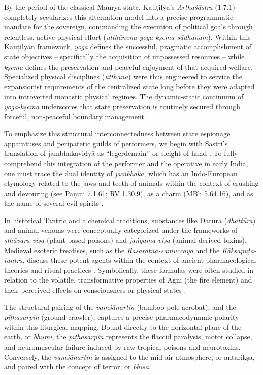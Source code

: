 \documentclass[11pt,twoside,letterpaper]{article}
\begin{document}
By the period of the classical Maurya state, Kauṭilya’s \textit{Arthaśāstra} (1.7.1) completely secularizes this alternation model into a precise programmatic mandate for the sovereign, commanding the execution of political goals through relentless, active physical effort (\textit{utthānena yoga-kṣema sādhanam}). Within this Kauṭilyan framework, \textit{yoga} defines the successful, pragmatic accomplishment of state objectives -- specifically the acquisition of unpossessed resources -- while \textit{kṣema} defines the preservation and peaceful enjoyment of that acquired welfare. Specialized physical disciplines (\textit{utthāna}) were thus engineered to service the expansionist requirements of the centralized state long before they were adapted into introverted monastic physical regimes. The dynamic-static continuum of \textit{yoga-kṣema} underscores that state preservation is routinely secured through forceful, non-peaceful boundary management.

To emphasize this structural interconnectedness between state espionage apparatuses and peripatetic guilds of performers, we begin with Sastri's translation of jambhakavidyā as ``legerdemain'' or sleight-of-hand \citep{shamasastri1929}. To fully comprehend this integration of the performer and the operative in early India, one must trace the dual identity of \textit{jambhaka}, which has an Indo-European etymology related to the jaws and teeth of animals within the context of crushing and devouring (see Pāṇini 7.1.61; RV 1.30.9), as a charm (MBh 5.64.16), and as the name of several evil spirits \citep{narten1965}. 

In historical Tantric and alchemical traditions, substances like Datura (\textit{dhattūra}) and animal venoms were conceptually categorized under the frameworks of \textit{sthāvara-viṣa} (plant-based poisons) and \textit{jaṅgama-viṣa} (animal-derived toxins). Medieval esoteric treatises, such as the \textit{Rasaratna-samuccaya} and the \textit{Kākṣapuṭa-tantra}, discuss these potent agents within the context of ancient pharmacological theories and ritual practices \citep{wujastyk2003roots, white1996alchemical}. Symbolically, these formulas were often studied in relation to the volatile, transformative properties of Agni (the fire element) and their perceived effects on consciousness or physical states \citep{svoboda1993aghora}.

The structural pairing of the \textit{vamśānartin} (bamboo pole acrobat), and the \textit{pīṭhasarpin} (ground-crawler), captures a precise pharmacodynamic polarity within this liturgical mapping. Bound directly to the horizontal plane of the earth, or \textit{bhūmi}, the \textit{pīṭhasarpin} represents the flaccid paralysis, motor collapse, and neuromuscular failure induced by raw tropical poisons and neurotoxins. Conversely, the \textit{vamśānartin} is assigned to the mid-air atmosphere, or antarikṣa, and paired with the concept of terror, or \textit{bhīsa}. 
\end{document}
